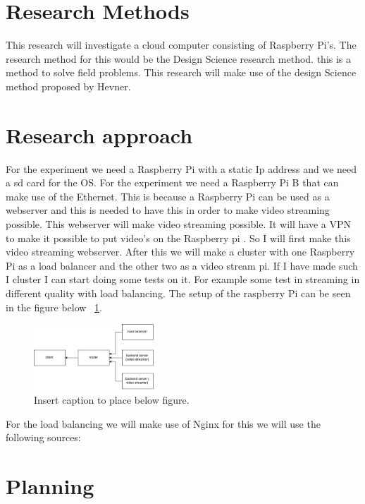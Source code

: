 \documentclass{sig-alternate-br}
\begin{document}
\section{Research Methods}
This research will investigate a cloud computer consisting of Raspberry Pi's. The research method for this would be the Design Science research method. this is a method to solve field problems. This research will make use of the design Science method proposed by Hevner\cite{hevner:2007}.

\section{Research approach}
For the experiment we need a Raspberry Pi with a static Ip address and we need a sd card for the OS. For the experiment we need a Raspberry Pi B that can make use of the Ethernet. This is because a Raspberry Pi can be used as a webserver and this is needed to have this in order to make video streaming possible. This webserver will make video streaming possible. It will have a VPN to make it possible to put video's on the Raspberry pi \cite{VPN:2014}. 
So I will first make this video streaming webserver. 
After this we will make a cluster with one Raspberry Pi as a load balancer and the other two as a video stream pi. If I have made such I cluster I can start doing some tests on it. For example some test in streaming in different quality with load balancing. The setup of the raspberry Pi can be seen in the figure below ~\ref{fig:setup}.

\begin{figure}[H]
\centering 
\includegraphics[width=0.4\textwidth]{raspberry pi setup.jpg}
\caption{Insert caption to place below figure.}
\label{fig:setup} %
\end{figure}
For the load balancing we will make use of Nginx for this we will use the following sources:
\cite{nginx-load-balancing, nginx-load-balancing-2}


\section{Planning}
\end{document}
